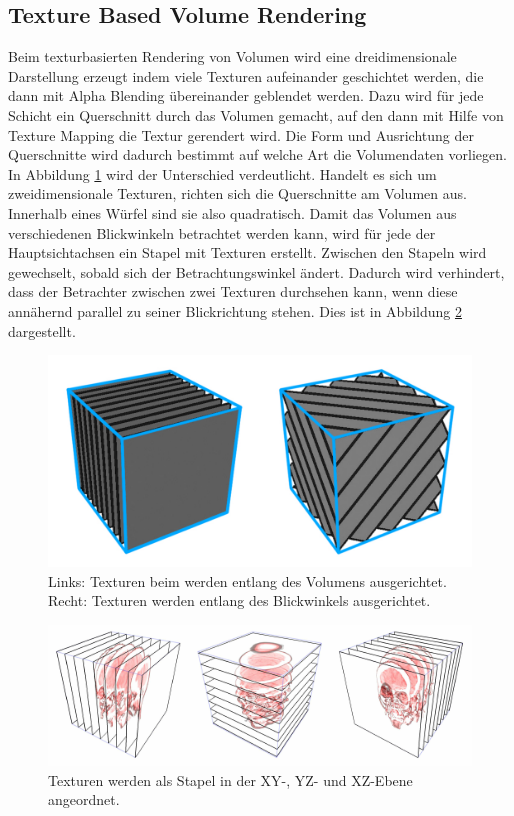 \subsection{Texture Based Volume Rendering}

Beim texturbasierten Rendering von Volumen wird eine dreidimensionale Darstellung erzeugt indem viele Texturen aufeinander geschichtet werden, die dann mit Alpha Blending übereinander geblendet werden. Dazu wird für jede Schicht ein Querschnitt durch das Volumen gemacht, auf den dann mit Hilfe von Texture Mapping die Textur gerendert wird.
Die Form und Ausrichtung der Querschnitte wird dadurch bestimmt auf welche Art die Volumendaten vorliegen. In Abbildung \ref{img:2D3DTex} wird der Unterschied verdeutlicht. Handelt es sich um zweidimensionale Texturen,  richten sich die Querschnitte am Volumen aus. Innerhalb eines Würfel sind sie also quadratisch. Damit das Volumen aus verschiedenen Blickwinkeln betrachtet werden kann, wird für jede der Hauptsichtachsen ein Stapel mit Texturen erstellt. Zwischen den Stapeln wird gewechselt, sobald sich der Betrachtungswinkel ändert. Dadurch wird verhindert, dass der Betrachter zwischen zwei Texturen durchsehen kann, wenn diese annähernd parallel zu seiner Blickrichtung stehen. Dies ist in Abbildung \ref{img:textureBased} dargestellt.

\begin{figure}
	\centering
	\includegraphics[width=0.7\linewidth]{images/texture_2d3d.pdf}
	\caption{Links: Texturen beim werden entlang des Volumens ausgerichtet. Recht: Texturen werden entlang des Blickwinkels ausgerichtet.}
	\label{img:2D3DTex}
\end{figure}

\begin{figure}
	\centering
	\includegraphics[width=0.7\linewidth]{images/textureStacks.png}
	\caption{Texturen werden als Stapel in der 	XY-, YZ- und XZ-Ebene angeordnet.}
	\label{img:textureBased}
\end{figure}

